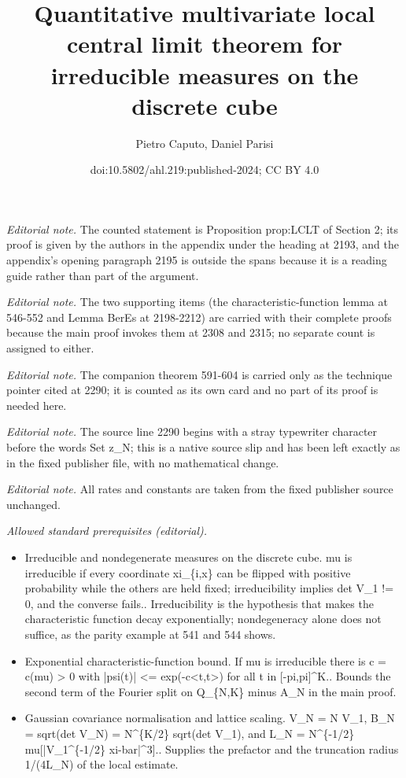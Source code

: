 \documentclass[10pt,a4paper]{article}
\title{Quantitative multivariate local central limit theorem for irreducible measures on the discrete cube}
\author{Pietro Caputo, Daniel Parisi}
\date{doi:10.5802/ahl.219:published-2024; CC BY 4.0}
\begin{document}
\maketitle
\noindent\textit{Editorial note.} The counted statement is Proposition prop:LCLT of Section 2; its proof is given by the authors in the appendix under the heading at 2193, and the appendix's opening paragraph 2195 is outside the spans because it is a reading guide rather than part of the argument.\par\medskip
\noindent\textit{Editorial note.} The two supporting items (the characteristic-function lemma at 546-552 and Lemma BerEs at 2198-2212) are carried with their complete proofs because the main proof invokes them at 2308 and 2315; no separate count is assigned to either.\par\medskip
\noindent\textit{Editorial note.} The companion theorem 591-604 is carried only as the technique pointer cited at 2290; it is counted as its own card and no part of its proof is needed here.\par\medskip
\noindent\textit{Editorial note.} The source line 2290 begins with a stray typewriter character before the words Set z\_N; this is a native source slip and has been left exactly as in the fixed publisher file, with no mathematical change.\par\medskip
\noindent\textit{Editorial note.} All rates and constants are taken from the fixed publisher source unchanged.\par\medskip
\noindent\textit{Allowed standard prerequisites (editorial).}\begin{itemize}
\item Irreducible and nondegenerate measures on the discrete cube. mu is irreducible if every coordinate xi\_\{i,x\} can be flipped with positive probability while the others are held fixed; irreducibility implies det V\_1 != 0, and the converse fails.. Irreducibility is the hypothesis that makes the characteristic function decay exponentially; nondegeneracy alone does not suffice, as the parity example at 541 and 544 shows.
\item Exponential characteristic-function bound. If mu is irreducible there is c = c(mu) > 0 with |psi(t)| <= exp(-c<t,t>) for all t in [-pi,pi]\textasciicircum{}K.. Bounds the second term of the Fourier split on Q\_\{N,K\} minus A\_N in the main proof.
\item Gaussian covariance normalisation and lattice scaling. V\_N = N V\_1, B\_N = sqrt(det V\_N) = N\textasciicircum{}\{K/2\} sqrt(det V\_1), and L\_N = N\textasciicircum{}\{-1/2\} mu[|V\_1\textasciicircum{}\{-1/2\} xi-bar|\textasciicircum{}3].. Supplies the prefactor and the truncation radius 1/(4L\_N) of the local estimate.
\end{itemize}\medskip
\end{document}
